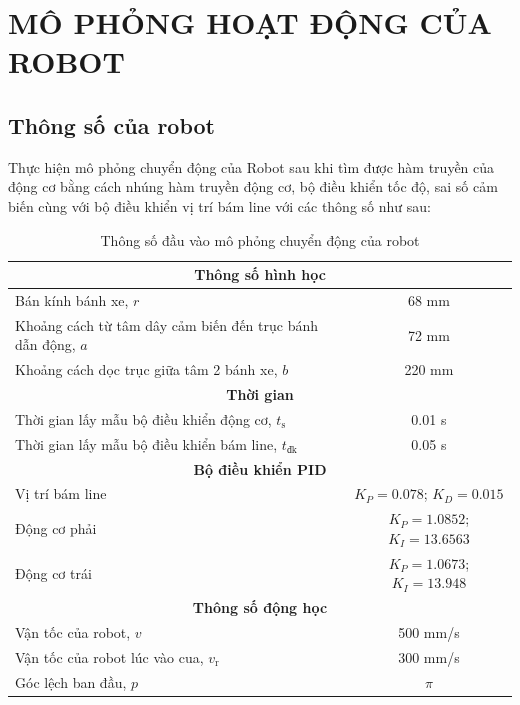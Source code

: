 \chapter{MÔ PHỎNG HOẠT ĐỘNG CỦA ROBOT}
     \section{Thông số của robot}
          \hspace*{0.6cm}Thực hiện mô phỏng chuyển động của Robot sau khi tìm được hàm truyền của động cơ bằng cách nhúng hàm truyền động cơ,
          bộ điều khiển tốc độ, sai số cảm biến cùng với bộ điều khiển vị trí bám line với các thông số như sau:
          \begin{table}[h]
               \centering
               \begin{tabular}{|l|c|}
               \hline
               \multicolumn{2}{|c|}{\textbf{Thông số hình học}} \\
               \hline
               Bán kính bánh xe, $r$ & 68 mm \\
               \hline
               Khoảng cách từ tâm dây cảm biến đến trục bánh dẫn động, $a$ & 72 mm \\
               \hline
               Khoảng cách dọc trục giữa tâm 2 bánh xe, $b$ & 220 mm \\
               \hline
               \multicolumn{2}{|c|}{\textbf{Thời gian}} \\
               \hline
               Thời gian lấy mẫu bộ điều khiển động cơ, $t_{\text{s}}$ & 0.01 s \\
               \hline
               Thời gian lấy mẫu bộ điều khiển bám line, $t_{\text{đk}}$ & 0.05 s \\
               \hline
               \multicolumn{2}{|c|}{\textbf{Bộ điều khiển PID}} \\
               \hline
               Vị trí bám line & $K_P = 0.078$; $K_D = 0.015$ \\
               \hline
               Động cơ phải & $K_P = 1.0852$; $K_I = 13.6563$ \\
               \hline
               Động cơ trái & $K_P = 1.0673$; $K_I = 13.948$ \\
               \hline
               \multicolumn{2}{|c|}{\textbf{Thông số động học}} \\
               \hline
               Vận tốc của robot, $v$ & 500 mm/s \\
               \hline
               Vận tốc của robot lúc vào cua, $v_{\text{r}}$ & 300 mm/s \\
               \hline
               Góc lệch ban đầu, $p$ & $\pi$ \\
               \hline
               \end{tabular}
               \label{tab:robot_specifications}
               \caption{Thông số đầu vào mô phỏng chuyển động của robot}
          \end{table}
